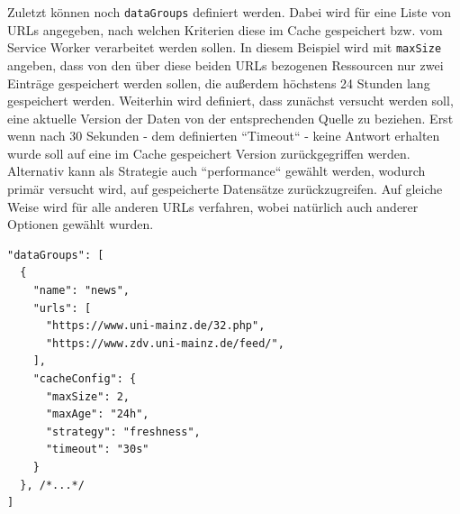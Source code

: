 Zuletzt können noch \texttt{dataGroups}\cite{SW-Config} definiert werden. Dabei wird für eine Liste von \acsp{URL} angegeben, nach welchen Kriterien diese im Cache gespeichert bzw. vom Service Worker verarbeitet werden sollen. In diesem Beispiel wird mit \texttt{maxSize} angeben, dass von den über diese beiden \acsp{URL} bezogenen Ressourcen nur zwei Einträge gespeichert werden sollen, die außerdem höchstens 24 Stunden lang gespeichert werden. Weiterhin wird definiert, dass zunächst versucht werden soll, eine aktuelle Version der Daten von der entsprechenden Quelle zu beziehen. Erst wenn nach 30 Sekunden - dem definierten ``Timeout`` - keine Antwort erhalten wurde soll auf eine im Cache gespeichert Version zurückgegriffen werden. Alternativ kann als Strategie auch ``performance`` gewählt werden, wodurch primär versucht wird, auf gespeicherte Datensätze zurückzugreifen. Auf gleiche Weise wird für alle anderen \acsp{URL} verfahren, wobei natürlich auch anderer Optionen gewählt wurden.
\begin{lstlisting}[float, floatplacement=h, style=htmlcssjs, caption={Exemplarische Konfiguration des Service Worker}, label={ngsw.config}]
"dataGroups": [
  {
    "name": "news",
    "urls": [
      "https://www.uni-mainz.de/32.php",
      "https://www.zdv.uni-mainz.de/feed/",
    ],
    "cacheConfig": {
      "maxSize": 2,
      "maxAge": "24h",
      "strategy": "freshness",
      "timeout": "30s"
    }
  }, /*...*/
]  
\end{lstlisting}
